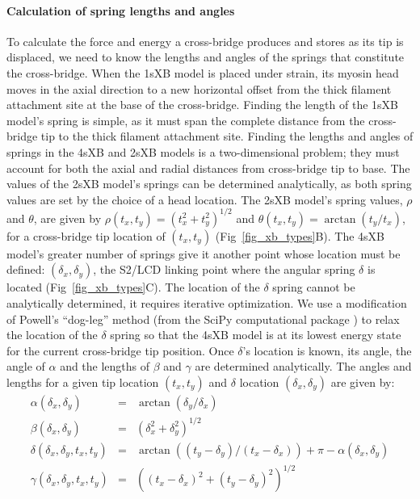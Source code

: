 \documentclass[10pt]{article}
\newcommand{\citep}[1]{\cite{#1}} %
\begin{document}
\paragraph{Calculation of spring lengths and angles} %
To calculate the force and energy a cross-bridge produces and stores as its tip is displaced, we need to know the lengths and angles of the springs that constitute the cross-bridge. 
When the 1sXB model is placed under strain, its myosin head moves in the axial direction to a new horizontal offset from the thick filament attachment site at the base of the cross-bridge.
Finding the length of the 1sXB model's spring is simple, as it must span the complete distance from the cross-bridge tip to the thick filament attachment site. 
Finding the lengths and angles of springs in the 4sXB and 2sXB models is a two-dimensional problem; they must account for both the axial and radial distances from cross-bridge tip to base.
The values of the 2sXB model's springs can be determined analytically, as both spring values are set by the choice of a head location. 
The 2sXB model's spring values, $\rho$ and $\theta$, are given by $\rho(t_x, t_y)=(t_x^2 + t_y^2)^{1/2}$ and $\theta(t_x, t_y)=\arctan(t_y/t_x)$, for a cross-bridge tip location of $(t_x, t_y)$ (Fig~\ref{fig_xb_types}B). 
The 4sXB model's greater number of springs give it another point whose location must be defined: $(\delta_x, \delta_y)$, the S2/LCD linking point where the angular spring $\delta$ is located (Fig~\ref{fig_xb_types}C). 
The location of the $\delta$ spring cannot be analytically determined, it requires iterative optimization. 
We use a modification of Powell's ``dog-leg'' method (from the SciPy computational package \citep{SciPy}) to relax the location of the $\delta$ spring so that the 4sXB model is at its lowest energy state for the current cross-bridge tip position.
Once $\delta$'s location is known, its angle, the angle of $\alpha$ and the lengths of $\beta$ and $\gamma$ are determined analytically.
The angles and lengths for a given tip location $(t_x, t_y)$ and $\delta$ location $(\delta_x, \delta_y)$ are given by:
\begin{eqnarray*}
\label{4sXB_spring_values}
\alpha(\delta_x, \delta_y) &=& \arctan(\delta_y/\delta_x) \\
\beta(\delta_x, \delta_y) &=& (\delta_x^2 + \delta_y^2)^{1/2} \\
\delta(\delta_x, \delta_y, t_x, t_y) &=& \arctan((t_y-\delta_y)/(t_x-\delta_x)) + \pi - \alpha(\delta_x, \delta_y) \\
\gamma(\delta_x, \delta_y, t_x, t_y) &=& ((t_x-\delta_x)^2 + (t_y-\delta_y)^2)^{1/2} 
\end{eqnarray*}
\end{document}
